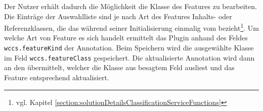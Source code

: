     Der Nutzer erhält dadurch die Möglichkeit die Klasse des Features zu bearbeiten.
    Die Einträge der Auswahlliste sind je nach Art des Features
    Inhalts- oder Referenzklassen, die das {\annotatorPlugin} während seiner
    Initialisierung einmalig vom {\classificationService}
    bezieht\footnote{vgl. Kapitel \ref{section:solutionDetailsClassificationServiceFunctions}}.
    Um welche Art von Feature es sich handelt ermittelt das Plugin anhand des Feldes
    \texttt{wccs.featureKind} der Annotation.
    Beim Speichern wird die ausgewählte Klasse im Feld \texttt{wccs.featureClass} gespeichert.
    Die aktualisierte Annotation wird dann an den {\annotationService} übermittelt,
    welcher die Klasse aus besagtem Feld ausliest und das Feature entsprechend
    aktualisiert.
